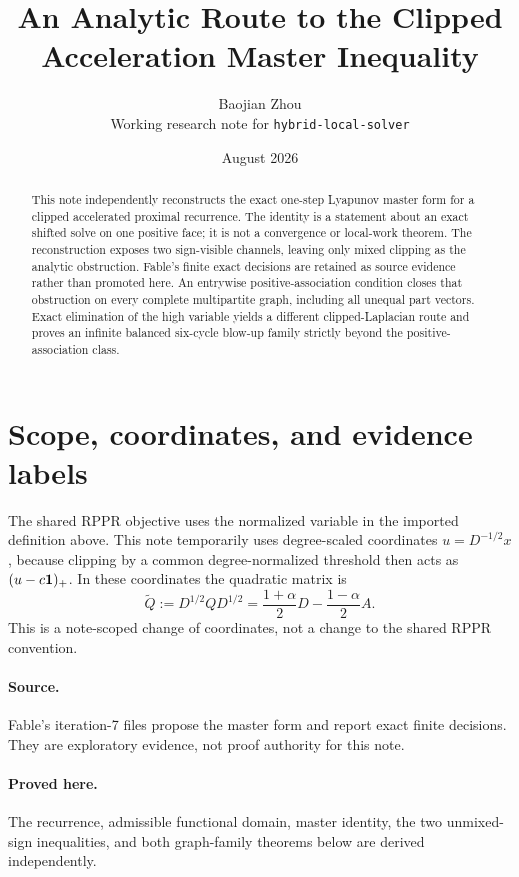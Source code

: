 \documentclass[11pt]{article}
\title{An Analytic Route to the Clipped Acceleration Master Inequality}
\author{Baojian Zhou\\
\small Working research note for \texttt{hybrid-local-solver}}
\date{August 2026}
\begin{document}
\maketitle

\begin{abstract}
This note independently reconstructs the exact one-step Lyapunov master form
for a clipped accelerated proximal recurrence.  The identity is a statement
about an exact shifted solve on one positive face; it is not a convergence or
local-work theorem.  The reconstruction exposes two sign-visible channels,
leaving only mixed clipping as the analytic obstruction.  Fable's finite
exact decisions are retained as source evidence rather than promoted here.
An entrywise positive-association condition closes that obstruction on every
complete multipartite graph, including all unequal part vectors.  Exact
elimination of the high variable yields a different clipped-Laplacian route
and proves an infinite balanced six-cycle blow-up family strictly beyond the
positive-association class.
\end{abstract}



\section{Scope, coordinates, and evidence labels}

The shared RPPR objective uses the normalized variable in the imported
definition above.  This note temporarily uses degree-scaled coordinates
$u=D^{-1/2}x$, because clipping by a common degree-normalized threshold then
acts as $(u-c\mathbf{1})_+$.  In these coordinates the quadratic matrix is
\begin{equation}
 \widetilde Q
 :=D^{1/2}QD^{1/2}
 =\frac{1+\alpha}{2}D-\frac{1-\alpha}{2}A.
 \label{eq:psi-scaled-q}
\end{equation}
This is a note-scoped change of coordinates, not a change to the shared RPPR
convention.

\paragraph{Source.}
Fable's iteration-7 files propose the master form and report exact finite
decisions.  They are exploratory evidence, not proof authority for this note.
\paragraph{Proved here.}
The recurrence, admissible functional domain, master identity, the two
unmixed-sign inequalities, and both graph-family theorems below are derived
independently.
\end{document}
